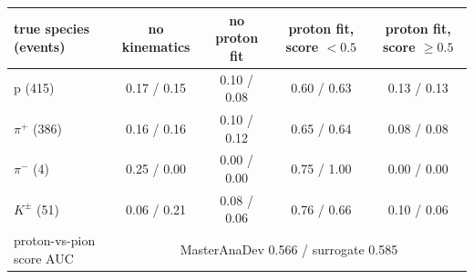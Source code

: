 \begin{tabular}{lcccc}
\toprule
true species (events) & no kinematics & no proton fit & proton fit, score $<0.5$ & proton fit, score $\geq 0.5$ \\
\midrule
p (415) & 0.17 / 0.15 & 0.10 / 0.08 & 0.60 / 0.63 & 0.13 / 0.13 \\
$\pi^+$ (386) & 0.16 / 0.16 & 0.10 / 0.12 & 0.65 / 0.64 & 0.08 / 0.08 \\
$\pi^-$ (4) & 0.25 / 0.00 & 0.00 / 0.00 & 0.75 / 1.00 & 0.00 / 0.00 \\
$K^\pm$ (51) & 0.06 / 0.21 & 0.08 / 0.06 & 0.76 / 0.66 & 0.10 / 0.06 \\
\midrule
proton-vs-pion score AUC & \multicolumn{4}{c}{MasterAnaDev 0.566 / surrogate 0.585} \\
\bottomrule
\end{tabular}
